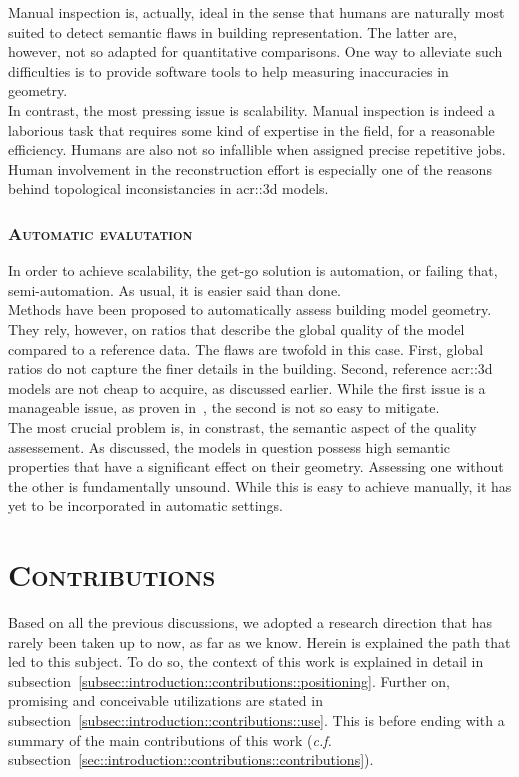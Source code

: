             Manual inspection is, actually, ideal in the sense that humans are naturally most suited to detect semantic flaws in building representation.
            The latter are, however, not so adapted for quantitative comparisons.
            One way to alleviate such difficulties is to provide software tools to help measuring inaccuracies in geometry\addref.\\

            In contrast, the most pressing issue is scalability.
            Manual inspection is indeed a laborious task that requires some kind of expertise in the field, for a reasonable efficiency.
            Humans are also not so infallible when assigned precise repetitive jobs.
            Human involvement in the reconstruction effort is especially one of the reasons behind topological inconsistancies in \gls{acr::3d} models.

        \subsubsection{\textsc{Automatic evalutation}}
            In order to achieve scalability, the get-go solution is automation, or failing that, semi-automation.
            As usual, it is easier said than done.\\

            Methods have been proposed to automatically assess building model geometry.
            They rely, however, on ratios that describe the global quality of the model compared to a reference data.
            The flaws are twofold in this case.
            First, global ratios do not capture the finer details in the building.
            Second, reference \gls{acr::3d} models are not cheap to acquire, as discussed earlier.
            While the first issue is a manageable issue, as proven in~\textcite{rottensteiner2012isprs}, the second is not so easy to mitigate.\\

            The most crucial problem is, in constrast, the semantic aspect of the quality assessement.
            As discussed, the models in question possess high semantic properties that have a significant effect on their geometry.
            Assessing one without the other is fundamentally unsound.
            While this is easy to achieve manually, it has yet to be incorporated in automatic settings.
\section{\textsc{Contributions}}
    \label{sec::introduction::contributions}
    Based on all the previous discussions, we adopted a research direction that has rarely been taken up to now, as far as we know.
    Herein is explained the path that led to this subject.
    To do so, the context of this work is explained in detail in subsection~\ref{subsec::introduction::contributions::positioning}.
    Further on, promising and conceivable utilizations are stated in subsection~\ref{subsec::introduction::contributions::use}.
    This is before ending with a summary of the main contributions of this work (\textit{c.f.} subsection~\ref{sec::introduction::contributions::contributions}).
    
